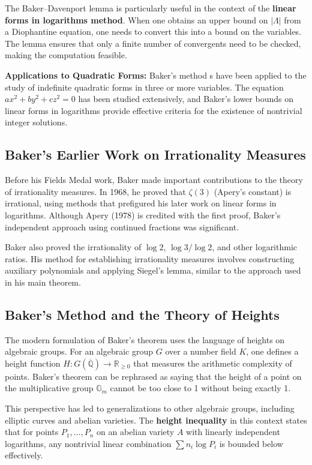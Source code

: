 The Baker--Davenport lemma is particularly useful in the context of the \textbf{linear forms in logarithms method}. When one obtains an upper bound on $|\Lambda|$ from a Diophantine equation, one needs to convert this into a bound on the variables. The lemma ensures that only a finite number of convergents need to be checked, making the computation feasible.

\textbf{Applications to Quadratic Forms:} Baker's method \cite{baker1966}s have been applied to the study of indefinite quadratic forms in three or more variables. The equation $ax^2 + by^2 + cz^2 = 0$ has been studied extensively, and Baker's lower bounds on linear forms in logarithms provide effective criteria for the existence of nontrivial integer solutions.

\subsection*{Baker's Earlier Work on Irrationality Measures}

Before his Fields Medal work, Baker made important contributions to the theory of irrationality measures. In 1968, he proved that $\zeta(3)$ (Apery's constant) is irrational, using methods that prefigured his later work on linear forms in logarithms. Although Apery (1978) is credited with the first proof, Baker's independent approach using continued fractions was significant.

Baker also proved the irrationality of $\log 2$, $\log 3 / \log 2$, and other logarithmic ratios. His method for establishing irrationality measures involves constructing auxiliary polynomials and applying Siegel's lemma, similar to the approach used in his main theorem.

\subsection*{Baker's Method and the Theory of Heights}

The modern formulation of Baker's theorem uses the language of heights on algebraic groups. For an algebraic group $G$ over a number field $K$, one defines a height function $H: G(\overline{\mathbb{Q}}) \to \mathbb{R}_{\geq 0}$ that measures the arithmetic complexity of points. Baker's theorem can be rephrased as saying that the height of a point on the multiplicative group $\mathbb{G}_m$ cannot be too close to 1 without being exactly 1.

This perspective has led to generalizations to other algebraic groups, including elliptic curves and abelian varieties. The \textbf{height inequality} in this context states that for points $P_1, \ldots, P_n$ on an abelian variety $A$ with linearly independent logarithms, any nontrivial linear combination $\sum n_i \log P_i$ is bounded below effectively.

